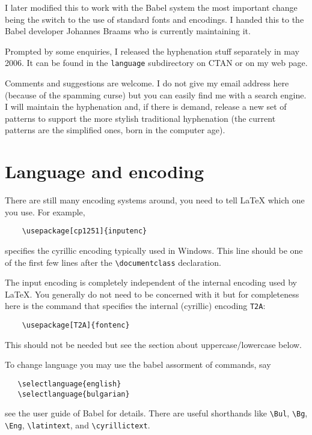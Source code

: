 \documentclass[12pt,a4paper,twosided]{article}
\begin{document}
I later modified this to work with the Babel system the most important change being the
switch to the use of standard fonts and encodings. 
I handed this to the Babel developer Johannes Braams who is currently maintaining it. 


Prompted by some enquiries, I released the hyphenation stuff separately in may 2006.  It can
be found in the \texttt{language} subdirectory on CTAN or on my web page. 



Comments and suggestions are welcome. 
I do not give my email address here (because of the spamming curse) but you can easily find
me with a search engine. 
I will maintain the hyphenation and, if there is
demand, release a new set of patterns to support the more stylish traditional hyphenation
(the current patterns are the simplified ones, born in the computer age).


\section{Language and encoding} \label{sec:langenc}



There are still many encoding systems around, you need to tell \LaTeX{} which one you use.
For example, 
\begin{verbatim}
    \usepackage[cp1251]{inputenc}
\end{verbatim}
specifies the cyrillic encoding typically used in Windows. 
This line should be one of the first few lines after the \verb+\documentclass+ declaration.

The input encoding is completely independent of the internal encoding used by 
\LaTeX. You generally do not need to be concerned with it but for completeness here is the
command that specifies the internal (cyrillic) encoding \texttt{T2A}:
\begin{verbatim}
    \usepackage[T2A]{fontenc}
\end{verbatim}
This should not be needed but see the section about uppercase/lowercase below.

To change language you may use the babel assorment of commands, say 
\begin{verbatim}
   \selectlanguage{english} 
   \selectlanguage{bulgarian}
\end{verbatim}
see the user guide of Babel for details.
There are useful shorthands like 
\verb+\Bul+,
\verb+\Bg+,
\verb+\Eng+,
\verb+\latintext+,
and
\verb+\cyrillictext+.
\end{document}
